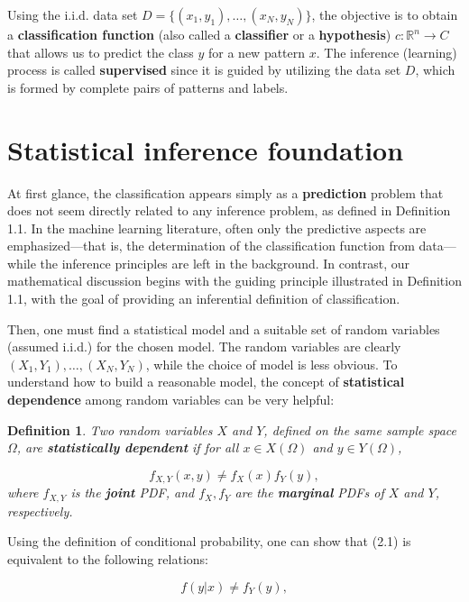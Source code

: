 \documentclass{report}
\newtheorem{definition}{Definition}[chapter]
\begin{document}
Using the i.i.d. data set $D = \{(x_1,y_1),\dots,(x_N,y_N)\}$, the objective is to obtain a \textbf{classification function} (also called a \textbf{classifier} or a \textbf{hypothesis}) $c : \mathbb{R}^n \to C$ that allows us to predict the class $y$ for a new pattern $x$. The inference (learning) process is called \textbf{supervised} since it is guided by utilizing the data set $D$, which is formed by complete pairs of patterns and labels.

\section{Statistical inference foundation}
At first glance, the classification appears simply as a \textbf{prediction} problem that does not seem directly related to any inference problem, as defined in Definition 1.1. In the machine learning literature, often only the predictive aspects are emphasized—that is, the determination of the classification function from data—while the inference principles are left in the background. In contrast, our mathematical discussion begins with the guiding principle illustrated in Definition 1.1, with the goal of providing an inferential definition of classification.

Then, one must find a statistical model and a suitable set of random variables (assumed i.i.d.) for the chosen model. The random variables are clearly $(X_1,Y_1),\dots,(X_N,Y_N)$, while the choice of model is less obvious. To understand how to build a reasonable model, the concept of \textbf{statistical dependence} among random variables can be very helpful:

\begin{definition}
Two random variables $X$ and $Y$, defined on the same sample space $\Omega$, are \textbf{statistically dependent} if for all $x\in X(\Omega)$ and $y \in Y(\Omega)$,

\begin{equation}
f_{X,Y}(x,y) \neq f_X(x)f_Y(y),
\end{equation}
where $f_{X,Y}$ is the \textbf{joint} PDF, and $f_X,f_Y$ are the \textbf{marginal} PDFs of $X$ and $Y$, respectively.
\end{definition}
Using the definition of conditional probability, one can show that (2.1) is equivalent to the following relations:

\begin{equation}
f(y|x) \neq f_Y(y),
\end{equation}
\end{document}
